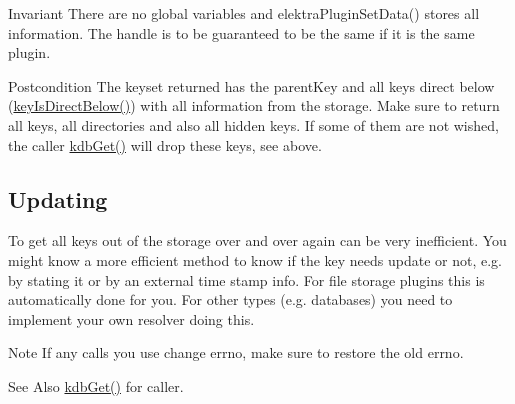 \begin{DoxyInvariant}{Invariant}
There are no global variables and elektra\-Plugin\-Set\-Data() stores all information. The handle is to be guaranteed to be the same if it is the same plugin.
\end{DoxyInvariant}
\begin{DoxyPostcond}{Postcondition}
The keyset {\ttfamily returned} has the {\ttfamily parent\-Key} and all keys direct below (\hyperlink{group__keytest_ga4f175aafd98948ce6c774f3bd92b72ca}{key\-Is\-Direct\-Below()}) with all information from the storage. Make sure to return all keys, all directories and also all hidden keys. If some of them are not wished, the caller \hyperlink{group__kdb_ga28e385fd9cb7ccfe0b2f1ed2f62453a1}{kdb\-Get()} will drop these keys, see above.
\end{DoxyPostcond}
\hypertarget{group__plugin_updating}{}\subsection{Updating}\label{group__plugin_updating}
To get all keys out of the storage over and over again can be very inefficient. You might know a more efficient method to know if the key needs update or not, e.\-g. by stating it or by an external time stamp info. For file storage plugins this is automatically done for you. For other types (e.\-g. databases) you need to implement your own resolver doing this.

\begin{DoxyNote}{Note}
If any calls you use change errno, make sure to restore the old errno.
\end{DoxyNote}
\begin{DoxySeeAlso}{See Also}
\hyperlink{group__kdb_ga28e385fd9cb7ccfe0b2f1ed2f62453a1}{kdb\-Get()} for caller.
\end{DoxySeeAlso}

